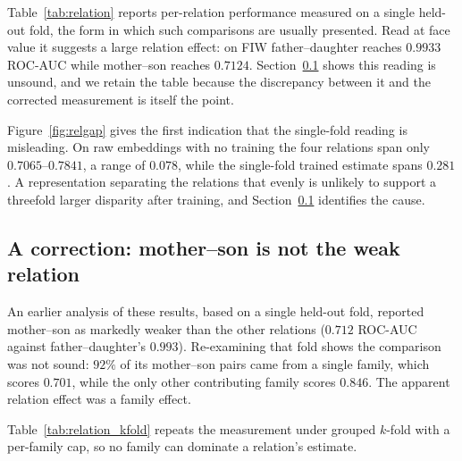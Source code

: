 \documentclass[journal,12pt]{IEEEtran}
\begin{document}
Table~\ref{tab:relation} reports per-relation performance measured on a
single held-out fold, the form in which such comparisons are usually presented.
Read at face value it suggests a large relation effect: on FIW father--daughter
reaches $0.9933$ ROC-AUC while mother--son reaches $0.7124$.
Section~\ref{sec:mscorrection} shows this reading is unsound, and we retain the
table because the discrepancy between it and the corrected measurement is
itself the point.

Figure~\ref{fig:relgap} gives the first indication that the single-fold
reading is misleading. On raw embeddings with no training the four relations
span only $0.7065$--$0.7841$, a range of $0.078$, while the single-fold trained
estimate spans $0.281$. A representation separating the relations that evenly
is unlikely to support a threefold larger disparity after training, and
Section~\ref{sec:mscorrection} identifies the cause.

\subsection{A correction: mother--son is not the weak relation}
\label{sec:mscorrection}

An earlier analysis of these results, based on a single held-out fold,
reported mother--son as markedly weaker than the other relations
($0.712$ ROC-AUC against father--daughter's $0.993$). Re-examining that fold
shows the comparison was not sound: $92\%$ of its mother--son pairs came from a
single family, which scores $0.701$, while the only other contributing family
scores $0.846$. The apparent relation effect was a family effect.

Table~\ref{tab:relation_kfold} repeats the measurement under grouped $k$-fold
with a per-family cap, so no family can dominate a relation's estimate.

\begin{table}[t]
\centering
\caption{Per-relation ROC-AUC under grouped $k$-fold with a per-family cap.
The single-fold column is the earlier, unsound estimate; the remaining columns
are the corrected measurement. Under a protocol in which no family dominates,
the four relations span $0.0310$ ROC-AUC.}
\label{tab:relation_kfold}
\small
{}
\end{table}
\end{document}
